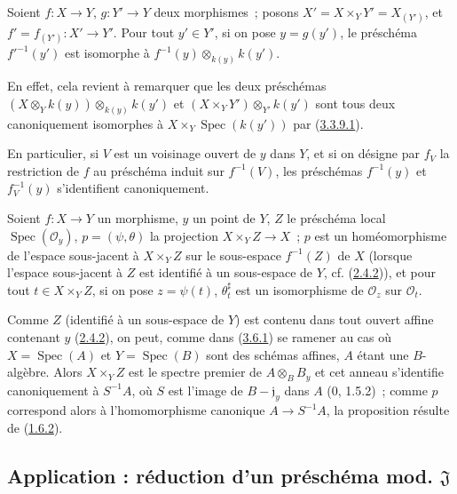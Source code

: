 \begin{proposition}
\label{I.3.6.4-fr}
Soient $f:X\to Y$, $g:Y'\to Y$ deux morphismes~; posons
$X'=X\times_Y Y'=X_{(Y')}$, et
$f'=f_{(Y')}:X'\to Y'$. Pour tout $y'\in Y'$, si on pose $y=g(y')$, le
préschéma $f'^{-1}(y')$ est isomorphe à
$f^{-1}(y)\otimes_{k(y)}k(y')$.
\end{proposition}

En effet, cela revient à remarquer que les deux préschémas
$(X\otimes_Y k(y))\otimes_{k(y)}k(y')$ et
$(X\times_Y Y')\otimes_{Y'}k(y')$ sont tous deux canoniquement isomorphes à
$X\times_Y\operatorname{Spec}(k(y'))$ par
(\hyperref[I.3.3.9.1-fr]{3.3.9.1}).

En particulier, si $V$ est un voisinage ouvert de $y$ dans $Y$, et si on
désigne par $f_V$ la restriction de $f$ au préschéma induit sur $f^{-1}(V)$,
les préschémas $f^{-1}(y)$ et $f_V^{-1}(y)$ s'identifient canoniquement.

\begin{proposition}[3.6.5]
\label{I.3.6.5-fr}
Soient $f:X\to Y$ un morphisme, $y$ un point de $Y$, $Z$ le préschéma local
$\operatorname{Spec}(\mathcal{O}_y)$, $p=(\psi,\theta)$ la projection
$X\times_Y Z\to X$~; $p$ est un homéomorphisme de l'espace sous-jacent à
$X\times_Y Z$ sur le sous-espace $f^{-1}(Z)$ de $X$ (lorsque l'espace
sous-jacent à $Z$ est identifié à un sous-espace de $Y$, cf.
(\hyperref[I.2.4.2-fr]{2.4.2})), et pour tout $t\in X\times_Y Z$, si on pose
$z=\psi(t)$, $\theta_t^\sharp$ est un isomorphisme de $\mathcal{O}_z$ sur
$\mathcal{O}_t$.
\end{proposition}

Comme $Z$ (identifié à un sous-espace de $Y$) est contenu dans tout ouvert
affine contenant $y$ (\hyperref[I.2.4.2-fr]{2.4.2}), on peut, comme dans
(\hyperref[I.3.6.1-fr]{3.6.1}) se ramener au cas où
$X=\operatorname{Spec}(A)$ et $Y=\operatorname{Spec}(B)$ sont des schémas
affines, $A$ étant une $B$-algèbre. Alors $X\times_Y Z$ est le spectre premier
de $A\otimes_B B_y$ et cet anneau s'identifie canoniquement à $S^{-1}A$, où
$S$ est l'image de $B-\mathfrak{j}_y$ dans $A$ (0, 1.5.2)~; comme $p$
correspond alors à l'homomorphisme canonique $A\to S^{-1}A$, la proposition
résulte de (\hyperref[I.1.6.2-fr]{1.6.2}).

\subsection{Application : réduction d'un préschéma mod.
\texorpdfstring{$\mathfrak{J}$\protect\footnotemark}{J}}
\label{subsection:I.3.7-fr}
\label{I.3.7-fr}

